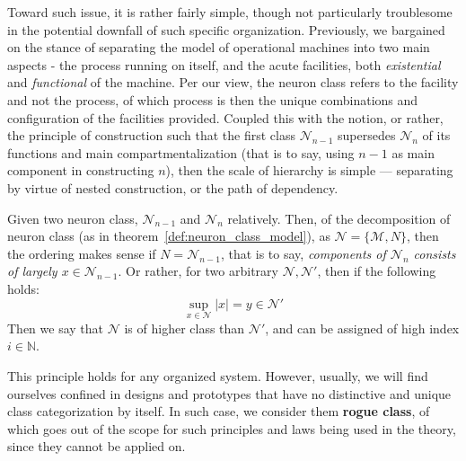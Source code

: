 Toward such issue, it is rather fairly simple, though not particularly troublesome in the potential downfall of such specific organization. Previously, we bargained on the stance of separating the model of operational machines into two main aspects - the process running on itself, and the acute facilities, both \textit{existential} and \textit{functional} of the machine. Per our view, the neuron class refers to the facility and not the process, of which process is then the unique combinations and configuration of the facilities provided. Coupled this with the notion, or rather, the principle of construction such that the first class $\mathcal{N}_{n-1}$ supersedes $\mathcal{N}_{n}$ of its functions and main compartmentalization (that is to say, using $n-1$ as main component in constructing $n$), then the scale of hierarchy is simple --- separating by virtue of nested construction, or the path of dependency. 
\begin{theorem}
    Given two neuron class, $\mathcal{N}_{n-1}$ and $\mathcal{N}_{n}$ relatively. Then, of the decomposition of neuron class (as in theorem~\ref{def:neuron_class_model}), as $\mathcal{N}=\{\mathcal{M},N\}$, then the ordering makes sense if $N=\mathcal{N}_{n-1}$, that is to say, \textit{components of $\mathcal{N}_{n}$ consists of largely $x\in \mathcal{N}_{n-1}$}. Or rather, for two arbitrary $\mathcal{N},\mathcal{N}'$, then if the following holds: 
    \begin{equation}
        \sup_{x\in \mathcal{N}} \lvert x\rvert = y \in \mathcal{N}'
    \end{equation}
    Then we say that $\mathcal{N}$ is of higher class than $\mathcal{N}'$, and can be assigned of high index $i\in \mathbb{N}$. 
\end{theorem}
This principle holds for any organized system. However, usually, we will find ourselves confined in designs and prototypes that have no distinctive and unique class categorization by itself. In such case, we consider them \textbf{rogue class}, of which goes out of the scope for such principles and laws being used in the theory, since they cannot be applied on. 
